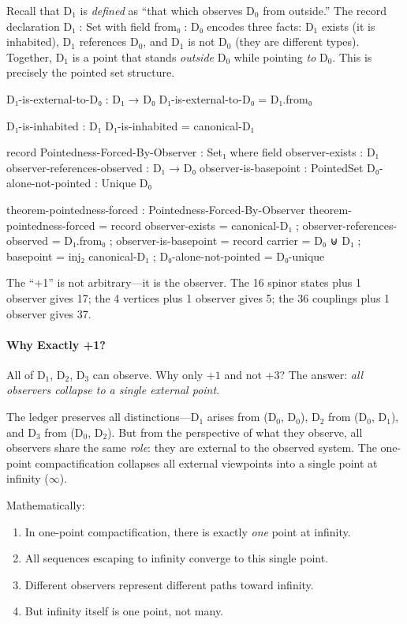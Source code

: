 \documentclass[11pt,a4paper]{book}
\def\texttt#1{#1}%
\begin{document}
Recall that D$_1$ is \emph{defined} as ``that which observes D$_0$ from outside.'' 
The record declaration \texttt{D₁ : Set} with field \texttt{from₀ : D₀} encodes 
three facts: D$_1$ exists (it is inhabited), D$_1$ references D$_0$, and D$_1$ is 
not D$_0$ (they are different types). Together, D$_1$ is a point that stands 
\emph{outside} D$_0$ while pointing \emph{to} D$_0$. This is precisely the 
pointed set structure.

\begin{code}
D₁-is-external-to-D₀ : D₁ → D₀
D₁-is-external-to-D₀ = D₁.from₀

D₁-is-inhabited : D₁
D₁-is-inhabited = canonical-D₁

record Pointedness-Forced-By-Observer : Set₁ where
  field
    observer-exists : D₁
    observer-references-observed : D₁ → D₀
    observer-is-basepoint : PointedSet
    D₀-alone-not-pointed : Unique D₀

theorem-pointedness-forced : Pointedness-Forced-By-Observer
theorem-pointedness-forced = record
  { observer-exists = canonical-D₁
  ; observer-references-observed = D₁.from₀
  ; observer-is-basepoint = record 
      { carrier = D₀ ⊎ D₁
      ; basepoint = inj₂ canonical-D₁
      }
  ; D₀-alone-not-pointed = D₀-unique
  }
\end{code}

The ``+1'' is not arbitrary---it is the observer. The 16 spinor states plus 
1 observer gives 17; the 4 vertices plus 1 observer gives 5; the 36 couplings 
plus 1 observer gives 37.

\paragraph{Why Exactly +1?}
All of D$_1$, D$_2$, D$_3$ can observe. Why only $+1$ and not $+3$? The answer: 
\emph{all observers collapse to a single external point}.

The ledger preserves all distinctions---D$_1$ arises from (D$_0$, D$_0$), 
D$_2$ from (D$_0$, D$_1$), and D$_3$ from (D$_0$, D$_2$). But from the perspective 
of what they observe, all observers share the same \emph{role}: they are external 
to the observed system. The one-point compactification collapses all external 
viewpoints into a single point at infinity ($\infty$).

Mathematically:
\begin{enumerate}
\item In one-point compactification, there is exactly \emph{one} point at infinity.
\item All sequences escaping to infinity converge to this single point.
\item Different observers represent different paths toward infinity.
\item But infinity itself is one point, not many.
\end{enumerate}
\end{document}
